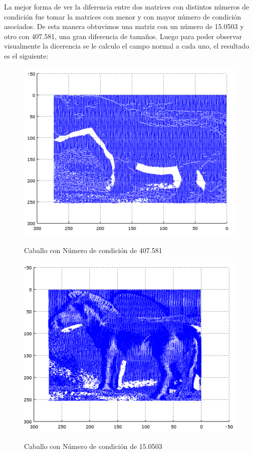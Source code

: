 La mejor forma de ver la diferencia entre dos matrices con distintos números de condición fue tomar la matrices con menor y con mayor número de condición asociados. De esta manera obtuvimos una matriz con un número de 15.0503 y otro con 407.581, una gran diferencia de tamaños. Luego para poder observar visualmente la dicerencia se le calculo el campo normal a cada uno, el resultado es el siguiente:



\begin{figure}[H]
   \includegraphics[scale=0.5]{caballoMax.png}
   \label{Fig. 4}
   \caption{Caballo con Número de condición de 407.581}
\end{figure}

\begin{figure}[H]
   \includegraphics[scale=0.5]{caballoMin.png}
   \label{Fig. 5}
   \caption{Caballo con Número de condición de 15.0503}
\end{figure}


